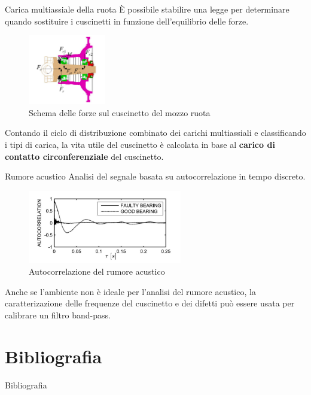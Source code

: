 \documentclass{beamer}
\begin{document}
\begin{frame}{Carica multiassiale della ruota}
    \small
    È possibile stabilire una legge per determinare quando sostituire i cuscinetti in funzione dell'equilibrio delle forze\cite{zhao2021service}.

    \begin{figure}
        \centering
        \includegraphics[width=0.3\textwidth]{Figures/Force_Diagram.png}
        \caption{Schema delle forze sul cuscinetto del mozzo ruota}
        \label{fig:Forces_Bearing}
    \end{figure}

    Contando il ciclo di distribuzione combinato dei carichi multiassiali e classificando i tipi di carica, la vita utile del cuscinetto è calcolata in base al \textbf{carico di contatto circonferenziale} del cuscinetto.
\end{frame}

\begin{frame}{Rumore acustico}
    Analisi del segnale basata su autocorrelazione in tempo discreto.

    \begin{figure}
        \centering
        \includegraphics[width=0.6\textwidth]{Figures/Acoustic.png}
        \caption{Autocorrelazione del rumore acustico}
        \label{fig:acoustic}
    \end{figure}

    Anche se l'ambiente non è ideale per l'analisi del rumore acustico, la caratterizazione delle frequenze del cuscinetto e dei difetti può essere usata per calibrare un filtro band-pass.

\end{frame}

\section*{Bibliografia}

\begin{frame}[allowframebreaks]{Bibliografia}
    \printbibliography
\end{frame}
\end{document}
